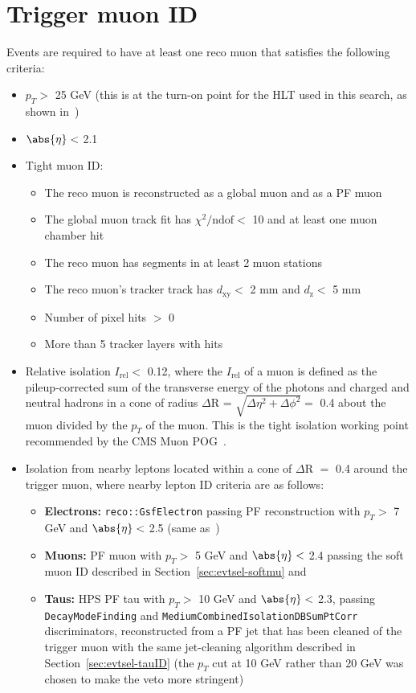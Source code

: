 \section{Trigger muon ID\label{sec:evtsel-triggermu}}

Events are required to have at least one reco muon that satisfies the following criteria:
\begin{itemize}
	\item $p_T >$ 25 GeV (this is at the turn-on point for the HLT used in this search, as shown in~\cite{CMS:muonhlttwiki})
	\item $\abs{\eta} <$ 2.1
	\item Tight muon ID:
	\begin{itemize}
		\item The reco muon is reconstructed as a global muon and as a PF muon
		\item The global muon track fit has $\chi^{2}/\text{ndof} <$ 10 and at least one muon chamber hit 
		\item The reco muon has segments in at least 2 muon stations
		\item The reco muon's tracker track has $d_{\text{xy}} <$ 2 mm and $d_{\text{z}} <$ 5 mm
		\item Number of pixel hits $>$ 0
		\item More than 5 tracker layers with hits
	\end{itemize}
	\item Relative isolation $I_{\text{rel}} <$ 0.12, where the $I_{\text{rel}}$ of a muon is defined as the pileup-corrected sum of the transverse energy of the photons and charged and neutral hadrons in a cone of radius $\Delta$R = $\sqrt{\Delta\eta^{2} + \Delta\phi^{2}} =$ 0.4 about the muon divided by the $p_T$ of the muon. This is the tight isolation working point recommended by the CMS Muon POG~\cite{CMS:muonidtwiki}.
        \item Isolation from nearby leptons located within a cone of $\Delta$R $=$ 0.4 around the trigger muon, where nearby lepton ID criteria are as follows:
          \begin{itemize}
          \item \textbf{Electrons:} \texttt{reco::GsfElectron} passing PF reconstruction with $p_T >$ 7 GeV and $\abs{\eta} <$ 2.5 (same as~\cite{Chatrchyan:2013mxa})
          \item \textbf{Muons:} PF muon with $p_T >$ 5 GeV and $\abs{\eta} <$ 2.4 passing the soft muon ID described in Section~\ref{sec:evtsel-softmu} and~\cite{CMS:2010uta}
          \item \textbf{Taus:} HPS PF tau with $p_T >$ 10 GeV and $\abs{\eta} <$ 2.3, passing \texttt{DecayModeFinding} and \texttt{MediumCombinedIsolationDBSumPtCorr} discriminators, reconstructed from a PF jet that has been cleaned of the trigger muon with the same jet-cleaning algorithm described in Section~\ref{sec:evtsel-tauID} (the $p_T$ cut at 10 GeV rather than 20 GeV was chosen to make the veto more stringent)
          \end{itemize}
\end{itemize}


